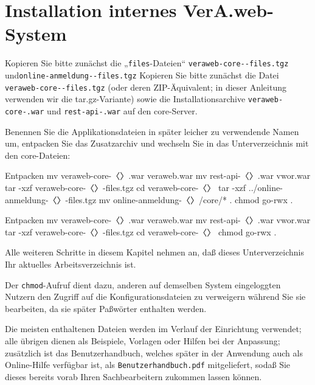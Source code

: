 \fi%

\section{Installation internes VerA.web-System}\label{sec:setup-int}

\ifoa
Kopieren Sie bitte zunächst die „\texttt{files}-Dateien“
\texttt{veraweb-core-\vwiaverssw{}-files.tgz} und\linebreak[1]
\texttt{online-anmeldung-\vwiaverssw{}-files.tgz}
\else%
Kopieren Sie bitte zunächst die Datei
\texttt{veraweb-core-\vwiaverssw{}-files.tgz}
\fi%
(oder deren ZIP-Äquivalent; in dieser Anleitung verwenden
wir die tar.gz-Variante) sowie die Installationsarchive
\texttt{veraweb-core-\vwiaverssw{}.war}
und \texttt{rest-api-\vwiaverssw{}.war} auf den core-Server.

\begin{minipage}{\textwidth}
Benennen Sie die Applikationsdateien in später leicher zu
verwendende Namen um, entpacken Sie das Zusatzarchiv und
wechseln Sie in das Unterverzeichnis mit den core-Dateien:

\ifoa
\begin{lstdump}{Entpacken}
mv veraweb-core-〈\lstdumpesc{\vwiaverssw}〉.war veraweb.war
mv rest-api-〈\lstdumpesc{\vwiaverssw}〉.war vwor.war
tar -xzf veraweb-core-〈\lstdumpesc{\vwiaverssw}〉-files.tgz
cd veraweb-core-〈\lstdumpesc{\vwiaverssw}〉
tar -xzf ../online-anmeldung-〈\lstdumpesc{\vwiaverssw}〉-files.tgz
mv online-anmeldung-〈\lstdumpesc{\vwiaverssw}〉/core/* .
chmod go-rwx .
\end{lstdump}
\else%
\begin{lstdump}{Entpacken}
mv veraweb-core-〈\lstdumpesc{\vwiaverssw}〉.war veraweb.war
mv rest-api-〈\lstdumpesc{\vwiaverssw}〉.war vwor.war
tar -xzf veraweb-core-〈\lstdumpesc{\vwiaverssw}〉-files.tgz
cd veraweb-core-〈\lstdumpesc{\vwiaverssw}〉
chmod go-rwx .
\end{lstdump}
\fi%
\end{minipage}

Alle weiteren Schritte in diesem Kapitel nehmen an, daß dieses
Unterverzeichnis Ihr aktuelles Arbeitsverzeichnis ist.

Der \texttt{chmod}-Aufruf dient dazu, anderen auf demselben System
eingeloggten Nutzern den Zugriff auf die Konfigurationsdateien zu
verweigern während Sie sie bearbeiten, da sie später Paßwörter
enthalten werden.

Die meisten enthaltenen Dateien werden im Verlauf der Einrichtung
verwendet; alle übrigen dienen als Beispiele, Vorlagen oder Hilfen
bei der Anpassung; zusätzlich ist das Benutzerhandbuch, welches
später in der Anwendung auch als Online-Hilfe verfügbar ist, als
\texttt{Benutzerhandbuch.pdf} mitgeliefert, sodaß Sie dieses bereits
vorab Ihren Sachbearbeitern zukommen lassen können.

